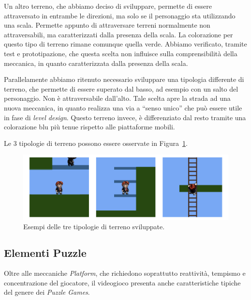 Un altro terreno, che abbiamo deciso di sviluppare, permette di essere attraversato in entrambe le direzioni, ma solo se il personaggio sta utilizzando una scala. Permette appunto di attraversare terreni normalmente non attraversabili, ma caratterizzati dalla presenza della scala. La colorazione per questo tipo di terreno rimane comunque quella verde. Abbiamo verificato, tramite test e prototipazione, che questa scelta non influisce sulla comprensibilità della meccanica, in quanto caratterizzata dalla presenza della scala.

Parallelamente abbiamo ritenuto necessario sviluppare una tipologia differente di terreno, che permette di essere superato dal basso, ad esempio con un salto del personaggio. Non è attraversabile dall’alto. Tale scelta apre la strada ad una nuova meccanica, in quanto realizza una via a “senso unico” che può essere utile in fase di \textit{level design}. Questo terreno invece, è differenziato dal resto tramite una colorazione blu più tenue rispetto alle piattaforme mobili.

Le 3 tipologie di terreno possono essere osservate in Figura~\ref{fig:platform_terreni}.

\begin{figure}%
	\centering
	\includegraphics[width= \columnwidth]{images/gameDesign/08.jpg}
	\caption{Esempi delle tre tipologie di terreno sviluppate.}
	\label{fig:platform_terreni}
\end{figure}

\subsection{Elementi Puzzle}
\label{elementi_puzzle}

Oltre alle meccaniche \textit{Platform}, che richiedono soprattutto reattività, tempismo e concentrazione del giocatore, il videogioco presenta anche caratteristiche tipiche del genere dei \textit{Puzzle Games}.

